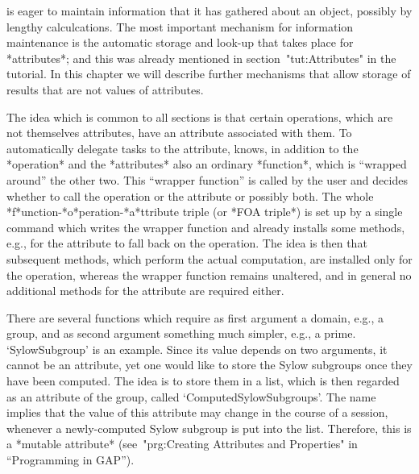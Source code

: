 
{\GAP}  is eager  to maintain information  that  it has gathered about an
object, possibly by lengthy  calculcations. The most  important mechanism
for information maintenance  is the  automatic  storage and look-up  that
takes  place  for  *attributes*; and    this   was already mentioned   in
section~"tut:Attributes"  in the   tutorial. In   this  chapter  we  will
describe further mechanisms that  allow storage of  results that  are not
values of attributes.

%
The  idea which is   common to all  sections  is that certain operations,
which are  not themselves attributes, have  an attribute  associated with
them. To automatically delegate tasks to the  attribute, {\GAP} knows, in
addition  to  the *operation*  and  the  *attributes*   also an  ordinary
*function*, which  is  ``wrapped around'' the  other  two. This ``wrapper
function''  is called by    the user and    decides whether to  call  the
operation    or  the    attribute     or  possibly     both.   The  whole
*f*unction-*o*peration-*a*ttribute triple (or *FOA triple*)  is set up by
a single   {\GAP} command which  writes the  wrapper function and already
installs  some methods,  e.g.,  for the attribute  to   fall back on  the
operation. The idea  is then that subsequent  methods, which  perform the
actual computation, are installed   only for the operation,   whereas the
wrapper function remains unaltered, and  in general no additional methods
for the attribute are required either.


There  are several functions  which  require as first  argument a domain,
e.g., a  group, and as second  argument  something much simpler,  e.g., a
prime. `SylowSubgroup'  is an  example. Since  its  value depends  on two
arguments, it cannot be  an attribute,  yet one would  like to  store the
Sylow subgroups once they have been computed.  The idea  is to store them
in a list,  which is then regarded as  an attribute of the  group, called
`ComputedSylowSubgroups'.  The  name   implies that  the  value  of  this
attribute may change in  the  course of   a  {\GAP}  session,  whenever a
newly-computed Sylow subgroup is put into the list.  Therefore, this is a
*mutable attribute* (see~"prg:Creating Attributes and Properties"
in ``Programming in GAP'').

